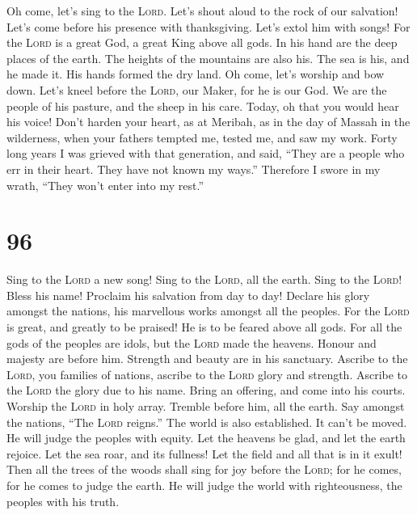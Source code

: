  Oh come, let's sing to the \textsc{Lord}. Let's shout
aloud to the rock of our salvation!  Let's come before his
presence with thanksgiving. Let's extol him with songs! 
For the \textsc{Lord} is a great God, a great King above all gods.
 In his hand are the deep places of the earth. The heights
of the mountains are also his.  The sea is his, and he
made it. His hands formed the dry land.  Oh come, let's
worship and bow down. Let's kneel before the \textsc{Lord}, our Maker,
 for he is our God. We are the people of his pasture, and
the sheep in his care. Today, oh that you would hear his voice!
 Don't harden your heart, as at Meribah, as in the day of
Massah in the wilderness,  when your fathers tempted me,
tested me, and saw my work.  Forty long years I was
grieved with that generation, and said, ``They are a people who err in
their heart. They have not known my ways.''  Therefore I
swore in my wrath, ``They won't enter into my rest.''

\hypertarget{section-95}{%
\section{96}\label{section-95}}

 Sing to the \textsc{Lord} a new song! Sing to the
\textsc{Lord}, all the earth.  Sing to the \textsc{Lord}!
Bless his name! Proclaim his salvation from day to day! 
Declare his glory amongst the nations, his marvellous works amongst all
the peoples.  For the \textsc{Lord} is great, and greatly
to be praised! He is to be feared above all gods.  For all
the gods of the peoples are idols, but the \textsc{Lord} made the
heavens.  Honour and majesty are before him. Strength and
beauty are in his sanctuary.  Ascribe to the
\textsc{Lord}, you families of nations, ascribe to the \textsc{Lord}
glory and strength.  Ascribe to the \textsc{Lord} the
glory due to his name. Bring an offering, and come into his courts.
 Worship the \textsc{Lord} in holy array. Tremble before
him, all the earth.  Say amongst the nations, ``The
\textsc{Lord} reigns.'' The world is also established. It can't be
moved. He will judge the peoples with equity.  Let the
heavens be glad, and let the earth rejoice. Let the sea roar, and its
fullness!  Let the field and all that is in it exult!
Then all the trees of the woods shall sing for joy 
before the \textsc{Lord}; for he comes, for he comes to judge the earth.
He will judge the world with righteousness, the peoples with his truth.


